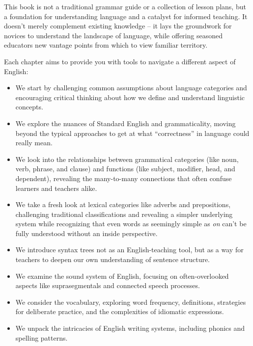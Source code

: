 \addchap{\lsPrefaceTitle} \label{ch:preface}

This book is not a traditional grammar guide or a collection of lesson plans, but a foundation for understanding language and a catalyst for informed teaching. It doesn't merely complement existing knowledge -- it lays the groundwork for novices to understand the landscape of language, while offering seasoned educators new vantage points from which to view familiar territory.

Each chapter aims to provide you with tools to navigate a different aspect of English:

\begin{itemize}
    \item We start by challenging common assumptions about language categories and encouraging critical thinking about how we define and understand linguistic concepts.

    \item We explore the nuances of Standard English and grammaticality, moving beyond the typical approaches to get at what ``correctness'' in language could really mean.

    \item We look into the relationships between grammatical categories (like noun, verb, phrase, and clause) and functions (like subject, modifier, head, and dependent), revealing the many-to-many connections that often confuse learners and teachers alike.

    \item We take a fresh look at lexical categories like adverbs and prepositions, challenging traditional classifications and revealing a simpler underlying system while recognizing that even words as seemingly simple as \textit{on} can't be fully understood without an inside perspective.

    \item We introduce syntax trees not as an English-teaching tool, but as a way for teachers to deepen our own understanding of sentence structure.

    \item We examine the sound system of English, focusing on often-overlooked aspects like suprasegmentals and connected speech processes.

    \item We consider the vocabulary, exploring word frequency, definitions, strategies for deliberate practice, and the complexities of idiomatic expressions.

    \item We unpack the intricacies of English writing systems, including phonics and spelling patterns.


\end{itemize}

